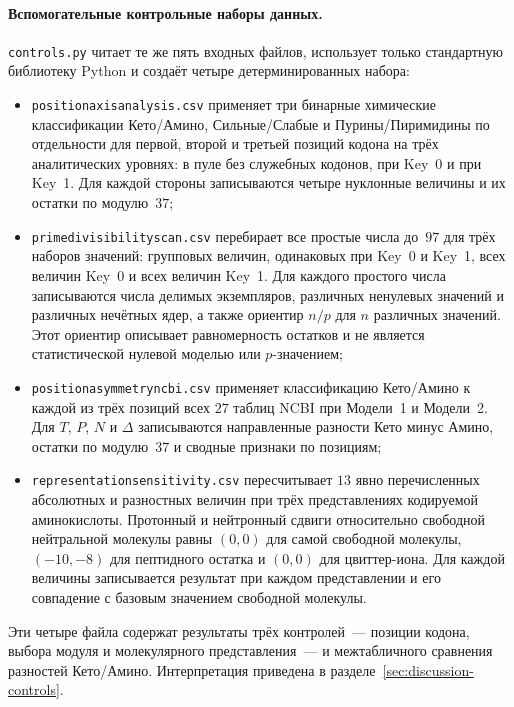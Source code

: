 \documentclass[11pt,a4paper]{article}
\renewcommand{\_}{\origunderscore\allowbreak}
\begin{document}
\paragraph{Вспомогательные контрольные наборы данных.}
\texttt{controls.py} читает те же пять входных файлов, использует
только стандартную библиотеку Python и создаёт четыре
детерминированных набора:
\begin{itemize}
  \item \texttt{position\_axis\_analysis.csv} применяет три
        бинарные химические классификации Кето/Амино,
        Сильные/Слабые и Пурины/Пиримидины по отдельности для первой,
        второй и третьей позиций кодона на трёх аналитических
        уровнях: в пуле без служебных кодонов, при Key~0 и при Key~1.
        Для каждой стороны записываются четыре нуклонные величины
        и их остатки по модулю~$37$;
  \item \texttt{prime\_divisibility\_scan.csv} перебирает все
        простые числа до~$97$ для трёх наборов значений:
        групповых величин, одинаковых при Key~0 и Key~1,
        всех величин Key~0 и всех величин Key~1. Для каждого
        простого числа записываются числа делимых экземпляров,
        различных ненулевых значений и различных нечётных ядер,
        а также ориентир $n/p$ для $n$ различных значений. Этот
        ориентир описывает равномерность остатков и не является
        статистической нулевой моделью или $p$-значением;
  \item \texttt{position\_asymmetry\_ncbi.csv} применяет
        классификацию Кето/Амино к каждой из трёх позиций всех
        $27$ таблиц NCBI при Модели~1 и Модели~2.
        Для $T$, $P$, $N$ и
        $\Delta$ записываются направленные разности Кето минус
        Амино, остатки по модулю~$37$ и сводные признаки по
        позициям;
  \item \texttt{representation\_sensitivity.csv} пересчитывает
        $13$ явно перечисленных абсолютных и разностных
        величин при трёх представлениях кодируемой аминокислоты.
        Протонный и нейтронный сдвиги относительно свободной
        нейтральной молекулы равны $(0,0)$ для самой свободной
        молекулы, $(-10,-8)$ для пептидного остатка и $(0,0)$ для
        цвиттер-иона. Для каждой величины записывается результат при
        каждом представлении и его совпадение с базовым значением
        свободной молекулы.
\end{itemize}
Эти четыре файла содержат результаты трёх контролей~---
позиции кодона, выбора модуля и молекулярного представления~---
и межтабличного сравнения разностей Кето/Амино.
Интерпретация приведена в
разделе~\ref{sec:discussion-controls}.
\end{document}
